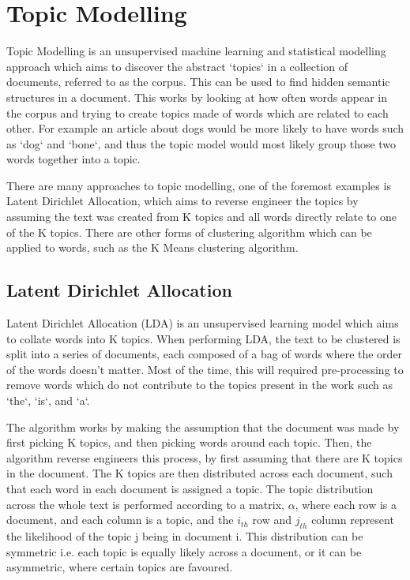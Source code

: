 \section{Topic Modelling}
Topic Modelling is an unsupervised machine learning and statistical modelling approach which aims to discover the abstract `topics` in a collection of documents, referred to as the corpus. This can be used to find hidden semantic structures in a document. This works by looking at how often words appear in the corpus and trying to create topics made of words which are related to each other. For example an article about dogs would be more likely to have words such as `dog` and `bone`, and thus the topic model would most likely group those two words together into a topic. 

There are many approaches to topic modelling, one of the foremost examples is Latent Dirichlet Allocation, which aims to reverse engineer the topics by assuming the text was created from K topics and all words directly relate to one of the K topics. There are other forms of clustering algorithm which can be applied to words, such as the K Means clustering algorithm. 

\subsection{Latent Dirichlet Allocation}
Latent Dirichlet Allocation (LDA) is an unsupervised learning model which aims to collate words into K topics. When performing LDA, the text to be clustered is split into a series of documents, each composed of a bag of words where the order of the words doesn't matter. Most of the time, this will required pre-processing to remove words which do not contribute to the topics present in the work such as `the`, `is`,  and `a`. 

\noindent The algorithm works by making the assumption that the document was made by first picking K topics, and then picking words around each topic. Then, the algorithm reverse engineers this process, by first assuming that there are K topics in the document. The K topics are then distributed across each document, such that each word in each document is assigned a topic. The topic distribution across the whole text is performed according to a matrix, $\alpha$,  where each row is a document, and each column is a topic, and the $i_{th}$ row and $j_{th}$ column represent the likelihood of the topic j being in document i. This distribution can be symmetric i.e. each topic is equally likely across a document, or it can be asymmetric, where certain topics are favoured.

